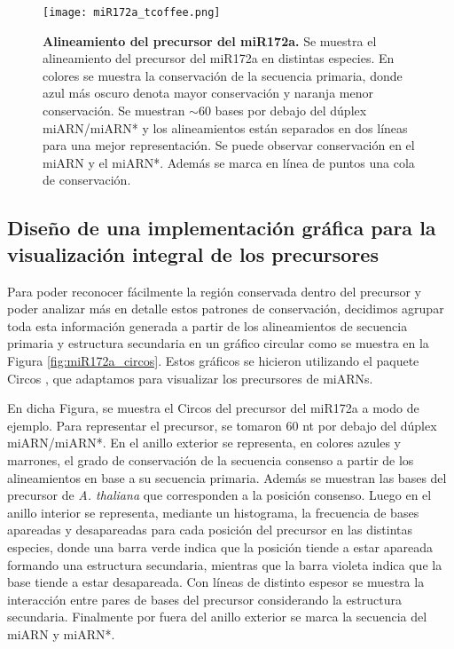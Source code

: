 \begin{landscape}
    \begin{figure}[htbp!] 
        \centering    
        \texttt{[image: miR172a\_tcoffee.png]}
        \caption[Alineamiento del precursor del miR172a.]{
        \textbf{Alineamiento del precursor del miR172a.}
        Se muestra el alineamiento del precursor del miR172a en distintas especies. 
        En colores se muestra la conservación de la secuencia primaria, donde azul más oscuro denota mayor conservación y naranja menor conservación.
        Se muestran $\sim$60 bases por debajo del dúplex miARN/miARN* y los alineamientos están separados en dos líneas para una mejor representación.
        Se puede observar conservación en el miARN y el miARN*.
        Además se marca en línea de puntos una cola de conservación.}
         \label{fig:miR172a_tcoffee}
    \end{figure}
\end{landscape}


\subsection{Diseño de una implementación gráfica para la visualización integral de los precursores}

Para poder reconocer fácilmente la región conservada dentro del precursor y poder analizar más en detalle estos patrones de conservación, decidimos agrupar toda esta información 
generada a partir de los alineamientos de secuencia primaria y estructura secundaria en un gráfico circular como se muestra en la Figura \ref{fig:miR172a_circos}.
Estos gráficos se hicieron utilizando el paquete Circos \citep{pmid19541911}, que adaptamos para visualizar los precursores de miARNs.
 
En dicha Figura, se muestra el Circos del precursor del miR172a a modo de ejemplo.
Para representar el precursor, se tomaron 60 nt por debajo del dúplex miARN/miARN*.
En el anillo exterior se representa, en colores azules y marrones, el grado de conservación de la secuencia consenso a partir de los alineamientos en base a su secuencia primaria.
Además se muestran las bases del precursor de \textit {A. thaliana} que corresponden a la posición consenso.
Luego en el anillo interior se representa, mediante un histograma, la frecuencia de bases apareadas y desapareadas para cada posición del precursor en las distintas especies, donde una barra verde indica que la posición tiende a estar apareada formando una estructura secundaria, mientras que la barra violeta indica que la base tiende a estar desapareada. 
Con líneas de distinto espesor se muestra la interacción entre pares de bases del precursor considerando la estructura secundaria. 
Finalmente por fuera del anillo exterior se marca la secuencia del miARN y miARN*.

